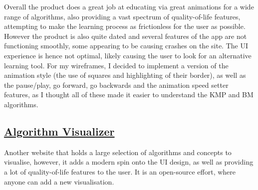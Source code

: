 
Overall the product does a great job at educating via great animations for a wide range of algorithms, also providing a vast spectrum of quality-of-life features, attempting to make the learning process as frictionless for the user as possible. However the product is also quite dated and several features of the app are not functioning smoothly, some appearing to be causing crashes on the site. The UI experience is hence not optimal, likely causing the user to look for an alternative learning tool. For my wireframes, I decided to implement a version of the animation style (the use of squares and highlighting of their border), as well as the pause/play, go forward, go backwards and the animation speed setter features, as I thought all of these made it easier to understand the KMP and BM algorithms.

\subsection{\href{https://algorithm-visualizer.org/}{Algorithm Visualizer}}

Another website that holds a large selection of algorithms and concepts to visualise, however, it adds a modern spin onto the UI design, as well as providing a lot of quality-of-life features to the user.   It is an open-source effort, where anyone can add a new visualisation.

